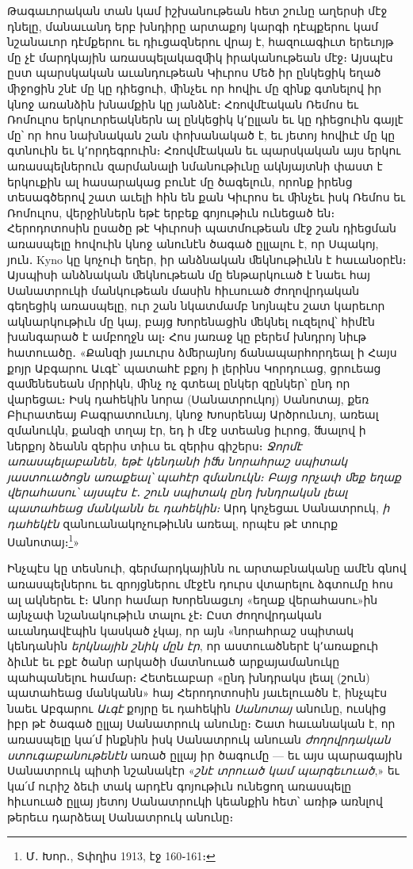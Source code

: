 \documentclass{article}
\begin{document}
{Թագաւորական տան կամ իշխանութեան հետ շունը աղերսի մէջ դնելը, մանաւանդ երբ խնդիրը արտաքոյ կարգի դէպքերու կամ նշանաւոր դէմքերու եւ դիւցազներու վրայ է, հազուագիւտ երեւոյթ մը չէ մարդկային առասպելակազﬕկ իրականութեան մէջ։ Այսպէս ըստ պարսկական աւանդութեան Կիւրոս Մեծ իր ընկեցիկ եղած ﬕջոցին շնէ մը կը դիեցուի, ﬕնչեւ որ հովիւ մը զինք գտնելով իր կնոջ առանձին խնամքին կը յանձնէ։ Հռովմէական Ռեմոս եւ Ռոմուլոս երկուորեակներն ալ ընկեցիկ կ՚ըլլան եւ կը դիեցուին գայլէ մը՝ որ հոս նախնական շան փոխանակած է, եւ յետոյ հովիւէ մը կը գտնուին եւ կ՚որդեգրուին։ Հռովմէական եւ պարսկական այս երկու առասպելներուն զարմանալի նմանութիւնը ակնյայտնի փաստ է երկուքին ալ հասարակաց բունէ մը ծագելուն, որոնք իրենց տեսագծերով շատ աւելի հին են քան Կիւրոս եւ ﬕնչեւ իսկ Ռեմոս եւ Ռոմուլոս, վերջիններն եթէ երբեք գոյութիւն ունեցած են։ Հերոդոտոսին ըսածը թէ Կիւրոսի պատմութեան մէջ շան դիեցման առասպելը հովուին կնոջ անունէն ծագած ըլլալու է, որ Սպակոյ, յուն․ Kyno կը կոչուի եղեր, իր անձնական ﬔկնութիւնն է հաւանօրէն։ Այսպիսի անձնական ﬔկնութեան մը ենթարկուած է նաեւ հայ Սանատրուկի մանկութեան մասին հիւսուած ժողովրդական գեղեցիկ առասպելը, ուր շան նկատմամբ նոյնպէս շատ կարեւոր ակնարկութիւն մը կայ, բայց Խորենացին ﬔկնել ուզելով՝ հիմէն խանգարած է ամբողջն ալ։ Հոս յառաջ կը բերեմ խնդրոյ նիւթ հատուածը․ «Քանզի յաւուրս ձﬔրայնոյ ճանապարհորդեալ ի Հայս քոյր Աբգարու Աւգէ՝ պատահէ բքոյ ի լերինս Կորդուաց, ցրուեաց զաﬔնեսեան մրրիկն, ﬕնչ ոչ գտեալ ընկեր զընկեր՝ ընդ որ վարեցաւ։ Իսկ դահեկին նորա (Սանատրուկոյ) Սանոտայ, քեռ Բիւրատեայ Բագրատունւոյ, կնոջ Խոսրենայ Արծրունւոյ, առեալ զմանուկն, քանզի տղայ էր, եդ ի մէջ ստեանց իւրոց, ﬓալով ի ներքոյ ձեանն զերիս տիւս եւ զերիս գիշերս։ \emph{Ջորմէ առասպելաբանեն, եթէ կենդանի իﬓ նորահրաշ սպիտակ յաստուածոցն առաքեալ՝ պահէր զմանուկն։ Բայց որչափ ﬔք եղաք վերահասու՝ այսպէս է․ շուն սպիտակ ընդ խնդրակսն լեալ պատահեաց մանկանն եւ դահեկին։} Արդ կոչեցաւ Սանատրուկ, \emph{ի դահեկէն} զանուանակոչութիւնն առեալ, որպէս թէ տուրք Սանոտայ։\footnote{Մ․ Խոր․, Տփղիս 1913, էջ 160֊161։}»

Ինչպէս կը տեսնուի, գերմարդկայինն ու արտաբնականը ամէն գնով առասպելներու եւ զրոյցներու մէջէն դուրս վտարելու ձգտումը հոս ալ ակներեւ է։ Անոր համար Խորենացւոյ «եղաք վերահասու»ին այնչափ նշանակութիւն տալու չէ։ Ըստ ժողովրդական աւանդավէպին կասկած չկայ, որ այն «նորահրաշ սպիտակ կենդանին \emph{երկնային շնիկ մըն էր}, որ աստուածներէ կ՚առաքուի ձիւնէ եւ բքէ ծանր արկածի մատնուած արքայամանուկը պահպանելու համար։ Հետեւաբար «ընդ խնդրակս լեալ (շուն) պատահեաց մանկանն» հայ Հերոդոտոսին յաւելուածն է, ինչպէս նաեւ Աբգարու \emph{Աւգէ} քոյրը եւ դահեկին \emph{Սանոտայ} անունը, ուսկից իբր թէ ծագած ըլլայ Սանատրուկ անունը։ Շատ հաւանական է, որ առասպելը կա՛մ ինքնին իսկ Սանատրուկ անուան \emph{ժողովրդական ստուգաբանութենէն} առած ըլլայ իր ծագումը — եւ այս պարագային Սանատրուկ պիտի նշանակէր «\emph{շնէ տրուած կամ պարգեւուած},» եւ կա՛մ ուրիշ ձեւի տակ արդէն գոյութիւն ունեցող առասպելը հիւսուած ըլլայ յետոյ Սանատրուկի կեանքին հետ՝ առիթ առնլով թերեւս դարձեալ Սանատրուկ անունը։

}
\end{document}
